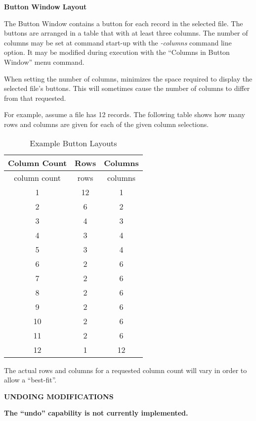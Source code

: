 {\bf Button Window Layout}

The Button Window contains a button for each  record in the
selected file.  The buttons are arranged in a table that with at least three
columns.  The number of columns may be set at command start-up with the {\it
-columns} command line option.  It may be modified during execution with the
``Columns in Button Window'' menu command.

When setting the number of columns,  minimizes the space
required to display the selected file's  buttons.  This will
sometimes cause the number of columns to differ from that requested.

For example, assume a  file has 12  records.
The following table shows how many rows and columns are given for each of the
given column selections.

\begin{table}[ht]
\begin{center}
\begin{tabular}{|c|c|c|}
\hline
{\bf Column Count} & {\bf Rows} & {\bf Columns} \\
\hline
column count & rows & columns \\
1            & 12   & 1 \\
2            & 6    & 2 \\
3            & 4    & 3 \\
4            & 3    & 4 \\
5            & 3    & 4 \\
6            & 2    & 6 \\
7            & 2    & 6 \\
8            & 2    & 6 \\
9            & 2    & 6 \\
10           & 2    & 6 \\
11           & 2    & 6 \\
12           & 1    & 12 \\
\hline
\end{tabular}
\end{center}
\caption{Example Button Layouts}
\end{table}

The actual rows and columns for a requested column count will vary in order
to allow a ``best-fit''.

{\bf UNDOING MODIFICATIONS}

{\bf The ``undo'' capability is not currently implemented.}

